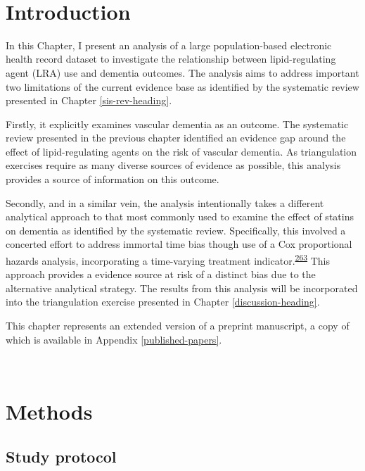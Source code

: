 \documentclass[a4paper, twoside]{templates/ociamthesis}
\begin{document}
~

\hypertarget{introduction-1}{%
\section{Introduction}\label{introduction-1}}

In this Chapter, I present an analysis of a large population-based electronic health record dataset to investigate the relationship between lipid-regulating agent (LRA) use and dementia outcomes. The analysis aims to address important two limitations of the current evidence base as identified by the systematic review presented in Chapter \ref{sis-rev-heading}.

Firstly, it explicitly examines vascular dementia as an outcome. The systematic review presented in the previous chapter identified an evidence gap around the effect of lipid-regulating agents on the risk of vascular dementia. As triangulation exercises require as many diverse sources of evidence as possible, this analysis provides a source of information on this outcome.

Secondly, and in a similar vein, the analysis intentionally takes a different analytical approach to that most commonly used to examine the effect of statins on dementia as identified by the systematic review. Specifically, this involved a concerted effort to address immortal time bias though use of a Cox proportional hazards analysis, incorporating a time-varying treatment indicator.\textsuperscript{\protect\hyperlink{ref-suissa2008}{263}} This approach provides a evidence source at risk of a distinct bias due to the alternative analytical strategy. The results from this analysis will be incorporated into the triangulation exercise presented in Chapter \ref{discussion-heading}.

This chapter represents an extended version of a preprint manuscript, a copy of which is available in Appendix \ref{published-papers}.

~

\hypertarget{methods-1}{%
\section{Methods}\label{methods-1}}

\hypertarget{study-protocol}{%
\subsection{Study protocol}\label{study-protocol}}
\end{document}
